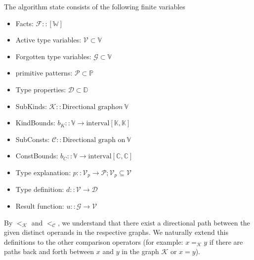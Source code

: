 \begin{defn}
    The algorithm state consists of the following finite variables
    \begin{itemize}
        \item Facts: $\mathcal{F} :: [\mathbb{W}]$
        \item Active type variables: $\mathcal{V} \subset \mathbb{V}$
        \item Forgotten type variables: $\mathcal{G} \subset \mathbb{V}$
        \item primitive patterns: $\mathcal{P} \subset \mathbb{P}$
        \item Type properties: $\mathcal{D} \subset \mathbb{D}$
        \item SubKinds: $\mathcal{K} :: \text{Directional graph} on\ \mathbb{V}$
        \item KindBounds: $b_K :: \mathbb{V} \to \text{interval} \left[\mathbb{K}, \mathbb{K}\right]$
        \item SubConsts: $\mathcal{C} :: \text{Directional graph on}\ \mathbb{V}$
        \item ConstBounds: $b_C :: \mathbb{V} \to \text{interval} \left[\mathbb{C}, \mathbb{C}\right]$
        \item Type explanation: $p :: \mathcal{V}_p \to \mathcal{P}; \mathcal{V}_p \subseteq \mathcal{V}$
        \item Type definition: $d :: \mathcal{V} \to \mathcal{D}$
        \item Result function: $u :: \mathcal{G} \to \mathcal{V}$
    \end{itemize}

    By $<_{\mathcal{K}}$ and $<_{\mathcal{C}}$,
    we understand that there exist a directional path between the given distinct operands in the respective graphs.
    We naturally extend this definitions to the other comparison operators
    (for example: $x =_{\mathcal{K}} y$ if there are paths back and forth between $x$ and $y$ in the graph $\mathcal{K}$ or $x = y$). %

\end{defn}


